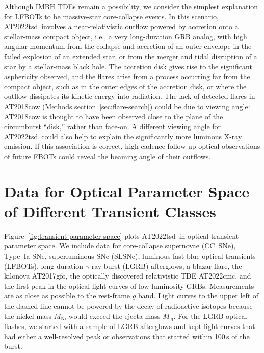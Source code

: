 \documentclass{nature_plusfigure}
\newcommand{\at}{AT2022tsd}
\begin{document}
\begin{methods}
Although IMBH TDEs remain a possibility, we consider the simplest explanation for LFBOTs to be massive-star core-collapse events. In this scenario, \at\ involves a near-relativistic outflow powered by accretion onto a stellar-mass compact object, i.e., a very long-duration GRB analog\cite{Quataert2012}, with high angular momentum from the collapse and accretion of an outer envelope in the failed explosion of an extended star\cite{Perley2021,Metzger2022}, or from the merger and tidal disruption of a star by a stellar-mass black hole\cite{Metzger2022}. The accretion disk gives rise to the significant asphericity observed\cite{Maund2023}, and the flares arise from a process occurring far from the compact object, such as in the outer edges of the accretion disk, or where the outflow dissipates its kinetic energy into radiation. The lack of detected flares in AT2018cow (Methods section~\ref{sec:flare-search}) could be due to viewing angle: AT2018cow is thought to have been observed close to the plane of the circumburst ``disk,'' rather than face-on\cite{Margutti2019,Chen2023}. A different viewing angle for \at\ could also help to explain the significantly more luminous X-ray emission.
If this association is correct, high-cadence follow-up optical observations of future FBOTs could reveal the beaming angle of their outflows.

\section{Data for Optical Parameter Space of Different Transient Classes}
\label{sec:data-transient-parameter-space}

Figure~\ref{fig:transient-parameter-space} plots \at\ in optical transient parameter space.
We include data for
core-collapse supernovae (CC~SNe\cite{PerleyBTS,Ho2023}), Type~Ia SNe\cite{PerleyBTS}, superluminous SNe (SLSNe\cite{PerleyBTS}), luminous fast blue optical transients (LFBOTs\cite{Prentice2018,Perley2019,Ho2019,Margutti2019,Perley2021,Ho2020_Koala,Yao2022,Coppejans2020,Ho2022_AT2020xnd,Arcavi2016,Pursiainen2018}), long-duration $\gamma$-ray burst (LGRB) afterglows\cite{Racusin2008,Kann2010}, 
a blazar flare\cite{Nesci2021}, the kilonova AT2017gfo\cite{Kasliwal2017,Villar2017,Cowperthwaite2017,Drout2017}, the optically discovered relativistic TDE AT2022cmc\cite{Andreoni2022}, and the first peak in the optical light curves of low-luminosity GRBs\cite{Galama1998,Campana2006,DElia2018,Ho2020_SN2020bvc}.
Measurements are as close as possible to the rest-frame $g$ band.
Light curves to the upper left of the dashed line\cite{Kasen2017} cannot be powered by the decay of radioactive isotopes because the nickel mass $M_\mathrm{Ni}$ would exceed the ejecta mass $M_\mathrm{ej}$. For the LGRB optical flashes, we started with a sample of LGRB afterglows\cite{Kann2010} and kept light curves that had either a well-resolved peak or observations that started within 100\,s of the burst.


\end{methods}
\end{document}
